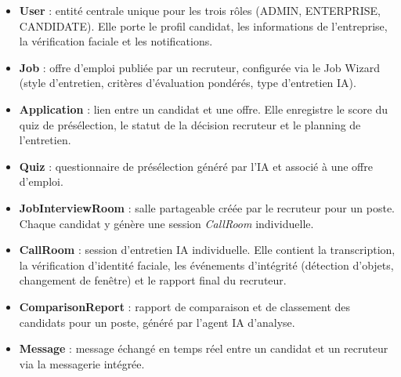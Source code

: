 \begin{itemize}
  \item \textbf{User} : entité centrale unique pour les trois rôles (ADMIN, ENTERPRISE,
        CANDIDATE). Elle porte le profil candidat, les informations de l'entreprise, la
        vérification faciale et les notifications.
  \item \textbf{Job} : offre d'emploi publiée par un recruteur, configurée via le Job Wizard
        (style d'entretien, critères d'évaluation pondérés, type d'entretien IA).
  \item \textbf{Application} : lien entre un candidat et une offre. Elle enregistre le score
        du quiz de présélection, le statut de la décision recruteur et le planning de
        l'entretien.
  \item \textbf{Quiz} : questionnaire de présélection généré par l'IA et associé à une offre
        d'emploi.
  \item \textbf{JobInterviewRoom} : salle partageable créée par le recruteur pour un poste.
        Chaque candidat y génère une session \textit{CallRoom} individuelle.
  \item \textbf{CallRoom} : session d'entretien IA individuelle. Elle contient la transcription,
        la vérification d'identité faciale, les événements d'intégrité (détection d'objets,
        changement de fenêtre) et le rapport final du recruteur.
  \item \textbf{ComparisonReport} : rapport de comparaison et de classement des candidats pour
        un poste, généré par l'agent IA d'analyse.
  \item \textbf{Message} : message échangé en temps réel entre un candidat et un recruteur
        via la messagerie intégrée.
\end{itemize}

